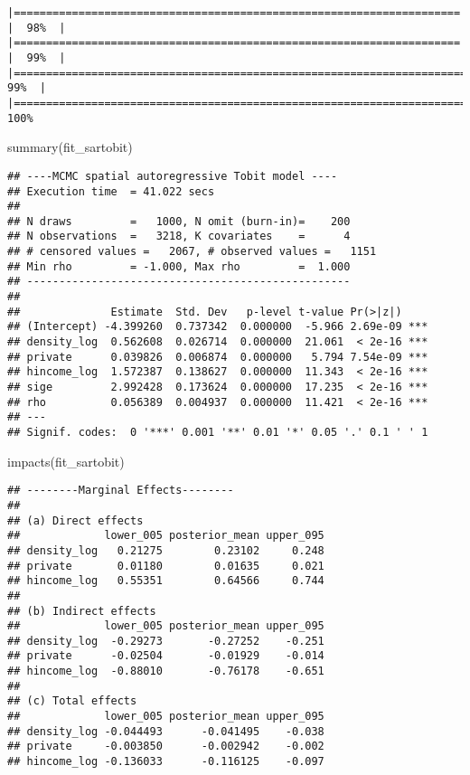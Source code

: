 \documentclass[10pt,letterpaper]{article}
\newenvironment{Shaded}{\begin{snugshade}}{\end{snugshade}}
\newcommand{\FunctionTok}[1]{\textcolor[rgb]{0.00,0.00,0.00}{#1}}
\newcommand{\NormalTok}[1]{#1}
\begin{document}
\begin{verbatim}
|===================================================================== |  98%  |                                                                              |===================================================================== |  99%  |                                                                              |======================================================================|  99%  |                                                                              |======================================================================| 100%
\end{verbatim}

\begin{Shaded}
\begin{Highlighting}[]
\FunctionTok{summary}\NormalTok{(fit\_sartobit)}
\end{Highlighting}
\end{Shaded}

\begin{verbatim}
## ----MCMC spatial autoregressive Tobit model ----
## Execution time  = 41.022 secs
## 
## N draws         =   1000, N omit (burn-in)=    200
## N observations  =   3218, K covariates    =      4
## # censored values =   2067, # observed values =   1151
## Min rho         = -1.000, Max rho         =  1.000
## --------------------------------------------------
## 
##              Estimate  Std. Dev   p-level t-value Pr(>|z|)    
## (Intercept) -4.399260  0.737342  0.000000  -5.966 2.69e-09 ***
## density_log  0.562608  0.026714  0.000000  21.061  < 2e-16 ***
## private      0.039826  0.006874  0.000000   5.794 7.54e-09 ***
## hincome_log  1.572387  0.138627  0.000000  11.343  < 2e-16 ***
## sige         2.992428  0.173624  0.000000  17.235  < 2e-16 ***
## rho          0.056389  0.004937  0.000000  11.421  < 2e-16 ***
## ---
## Signif. codes:  0 '***' 0.001 '**' 0.01 '*' 0.05 '.' 0.1 ' ' 1
\end{verbatim}

\begin{Shaded}
\begin{Highlighting}[]
\FunctionTok{impacts}\NormalTok{(fit\_sartobit)}
\end{Highlighting}
\end{Shaded}

\begin{verbatim}
## --------Marginal Effects--------
## 
## (a) Direct effects
##             lower_005 posterior_mean upper_095
## density_log   0.21275        0.23102     0.248
## private       0.01180        0.01635     0.021
## hincome_log   0.55351        0.64566     0.744
## 
## (b) Indirect effects
##             lower_005 posterior_mean upper_095
## density_log  -0.29273       -0.27252    -0.251
## private      -0.02504       -0.01929    -0.014
## hincome_log  -0.88010       -0.76178    -0.651
## 
## (c) Total effects
##             lower_005 posterior_mean upper_095
## density_log -0.044493      -0.041495    -0.038
## private     -0.003850      -0.002942    -0.002
## hincome_log -0.136033      -0.116125    -0.097
\end{verbatim}
\end{document}
